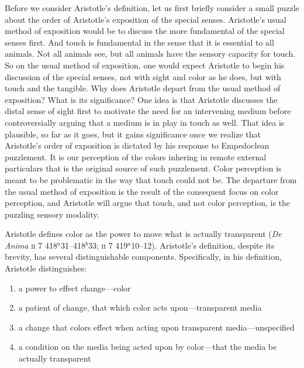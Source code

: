 Before we consider Aristotle's definition, let us first briefly consider a small puzzle about the order of Aristotle's exposition of the special senses. Aristotle's usual method of exposition would be to discuss the more fundamental of the special senses first. And touch is fundamental in the sense that it is essential to all animals. Not all animals see, but all animals have the sensory capacity for touch. So on the usual method of exposition, one would expect Aristotle to begin his discussion of the special senses, not with sight and color as he does, but with touch and the tangible. Why does Aristotle depart from the usual method of exposition? What is its significance? One idea is that Aristotle discusses the distal sense of sight first to motivate the need for an intervening medium before controversially arguing that a medium is in play in touch as well. That idea is plausible, so far as it goes, but it gains significance once we realize that Aristotle's order of exposition is dictated by his response to Empedoclean puzzlement. It is our perception of the colors inhering in remote external particulars that is the original source of such puzzlement. Color perception is meant to be problematic in the way that touch could not be. The departure from the usual method of exposition is the result of the consequent focus on color perception, and Aristotle will argue that touch, and not color perception, is the puzzling sensory modality.

Aristotle defines color as the power to move what is actually transparent (\emph{De Anima} \textsc{ii} 7 418\( ^{a} \)31--418\( ^{b} \)33; \textsc{ii} 7 419\( ^{a} \)10--12). Aristotle's definition, despite its brevity, has several distinguishable components. Specifically, in his definition, Aristotle distinguishes: 
\begin{enumerate}[(1)]
	\item a power to effect change---color
	\item a patient of change, that which color acts upon---transparent media
	\item a change that colors effect when acting upon transparent media---unspecified
	\item  a condition on the media being acted upon by color---that the media be actually transparent
\end{enumerate}

